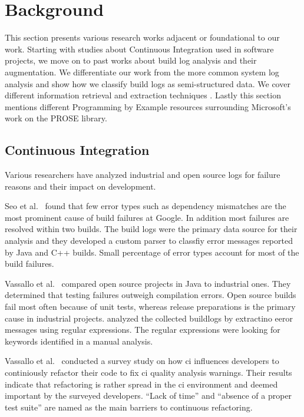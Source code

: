 \documentclass[\myrootdir/main.tex]{subfiles}
\begin{document}
\chapter{Background}
\label{sec:rw}
This section presents various research works adjacent or foundational to our work.
Starting with studies about Continuous Integration used in software projects, we move on to past works about build log analysis and their augmentation.
We differentiate our work from the more common system log analysis and show how we classify build logs as semi-structured data.
We cover different information retrieval and extraction techniques .
Lastly this section mentions different Programming by Example resources surrounding Microsoft's work on the PROSE library.

\section{Continuous Integration}
Various researchers have analyzed industrial and open source logs for failure reasons and their impact on development.

Seo et al.~\cite{seo2014programmers} found that few error types such as dependency mismatches are the most prominent cause of build failures at Google.
In addition most failures are resolved within two builds.
The build logs were the primary data source for their analysis and they developed a custom parser to classfiy error messages reported by Java and C++ builds. 
Small percentage of error types account for most of the build failures.

Vassallo et al.~\cite{vassallo2017a-tale} compared open source projects in Java to industrial ones.
They determined that testing failures outweigh compilation errors.
Open source builds fail most often because of unit tests, whereas release preparations is the primary cause in industrial projects.
analyzed the collected buildlogs by extractino eeror messages using regular expressions.
The regular expressions were looking for keywords identified in a manual analysis.

Vassallo et al.~\cite{vassallo2018continuous} conducted a survey study on how ci influences developers to continiously refactor their code to fix ci quality analysis warnings.
Their results indicate that refactoring is rather spread in the ci environment and deemed important by the surveyed developers.
``Lack of time'' and ``absence of a proper test suite'' are named as the main barriers to continuous refactoring.
\end{document}
